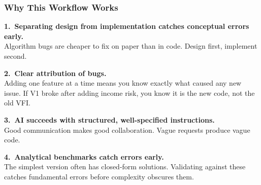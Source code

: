 \documentclass[10pt,english,aspectratio=169]{beamer}
\begin{document}
\begin{frame}
\frametitle{Why This Workflow Works}

\textbf{1.~Separating design from implementation catches conceptual errors early.}\\
Algorithm bugs are cheaper to fix on paper than in code. Design first, implement second.

\vspace{0.3cm}

\textbf{2.~Clear attribution of bugs.}\\
Adding one feature at a time means you know exactly what caused any new issue. If V1 broke after adding income risk, you know it is the new code, not the old VFI.

\vspace{0.3cm}

\textbf{3.~AI succeeds with structured, well-specified instructions.}\\
Good communication makes good collaboration. Vague requests produce vague code.

\vspace{0.3cm}

\textbf{4.~Analytical benchmarks catch errors early.}\\
The simplest version often has closed-form solutions. Validating against these catches fundamental errors before complexity obscures them.
\end{frame}
\end{document}
